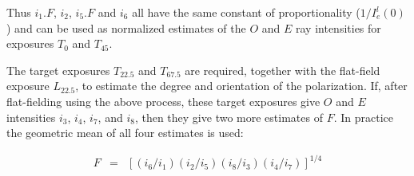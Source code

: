 Thus $i_{1}.F$, $i_{2}$, $i_{5}.F$ and $i_{6}$ all have the same 
constant of proportionality ($1/I^{l}_{e}(0)$) and can be used as 
normalized estimates of the $O$ and $E$ ray intensities for exposures
$T_{0}$ and $T_{45}$.

The target exposures $T_{22.5}$ and $T_{67.5}$ are required, together
with the flat-field exposure $L_{22.5}$, to estimate the degree and
orientation of the polarization. If, after flat-fielding using the above 
process, these target exposures give $O$ and $E$ intensities $i_{3}$, 
$i_{4}$, $i_{7}$, and $i_{8}$, then they give two more estimates of $F$.
In practice the geometric mean of all four estimates is used:

\begin{myquote}
\begin{eqnarray*}
  F & = & [(i_{6}/i_{1})(i_{2}/i_{5})(i_{8}/i_{3})(i_{4}/i_{7})]^{1/4}
\end{eqnarray*}
\end{myquote}


